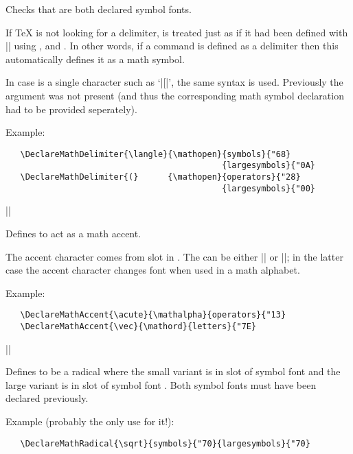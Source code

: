 \documentclass{ltxguide}[1995/11/28]
\begin{document}
Checks that  are both declared symbol fonts.
 
If \TeX{} is not looking for a delimiter,  is treated just as
if it had been defined with |\DeclareMathSymbol| using
,  and .  In other words, if a
command is defined as a delimiter then this automatically defines it
as a math symbol.

In case  is a single character such as `|[|', the same syntax is
used.  Previously the  argument was not present (and thus the
corresponding math symbol declaration had to be provided seperately).
 
Example:
\begin{verbatim}
   \DeclareMathDelimiter{\langle}{\mathopen}{symbols}{"68}
                                            {largesymbols}{"0A}
   \DeclareMathDelimiter{(}      {\mathopen}{operators}{"28}
                                            {largesymbols}{"00}
\end{verbatim}
 
 
\begin{decl}
|\DeclareMathAccent|    
\end{decl}
 
Defines  to act as a math accent.
 
The accent character comes from slot  in
. The  can be either
|\mathord| or |\mathalpha|; in the latter case the accent character
changes font when used in a math alphabet.
 
Example:
\begin{verbatim}
   \DeclareMathAccent{\acute}{\mathalpha}{operators}{"13}
   \DeclareMathAccent{\vec}{\mathord}{letters}{"7E}
\end{verbatim}
 
 
\begin{decl}
|\DeclareMathRadical| 
                     \\
       \null\hfill  {} 
\end{decl}
 
Defines  to be a radical where the small variant is in
slot  of symbol font  and the
large variant is in slot  of symbol font
.  Both symbol fonts must have been declared
previously.
 
Example (probably the only use for it!):
\begin{verbatim}
   \DeclareMathRadical{\sqrt}{symbols}{"70}{largesymbols}{"70}
\end{verbatim}
 
\end{document}
